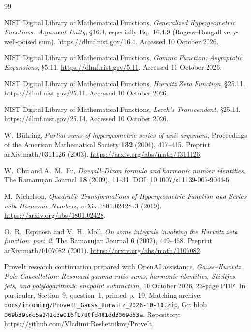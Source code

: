 \documentclass[11pt,letterpaper]{article}
\numberwithin{equation}{section}
\theoremstyle{definition}
\theoremstyle{remark}
\newcommand{\file}[1]{\nolinkurl{#1}}
\begin{document}
\begin{thebibliography}{99}
\raggedright

NIST Digital Library of Mathematical Functions,
\emph{Generalized Hypergeometric Functions: Argument Unity},
\S16.4, especially Eq.~16.4.9 (Rogers--Dougall very-well-poised sum).
\url{https://dlmf.nist.gov/16.4}. Accessed 10 October 2026.

NIST Digital Library of Mathematical Functions,
\emph{Gamma Function: Asymptotic Expansions}, \S5.11.
\url{https://dlmf.nist.gov/5.11}. Accessed 10 October 2026.

NIST Digital Library of Mathematical Functions,
\emph{Hurwitz Zeta Function}, \S25.11.
\url{https://dlmf.nist.gov/25.11}. Accessed 10 October 2026.

NIST Digital Library of Mathematical Functions,
\emph{Lerch's Transcendent}, \S25.14.
\url{https://dlmf.nist.gov/25.14}. Accessed 10 October 2026.

W.~B\"uhring, \emph{Partial sums of hypergeometric series of unit argument},
Proceedings of the American Mathematical Society \textbf{132} (2004),
407--415. Preprint arXiv:math/0311126 (2003).
\url{https://arxiv.org/abs/math/0311126}.

W.~Chu and A.~M.~Fu, \emph{Dougall--Dixon formula and harmonic number
identities}, The Ramanujan Journal \textbf{18} (2009), 11--31.
DOI: \href{https://doi.org/10.1007/s11139-007-9044-6}{10.1007/s11139-007-9044-6}.

M.~Nicholson, \emph{Quadratic Transformations of Hypergeometric Function
and Series with Harmonic Numbers}, arXiv:1801.02428v3 (2019).
\url{https://arxiv.org/abs/1801.02428}.

O.~R.~Espinosa and V.~H.~Moll,
\emph{On some integrals involving the Hurwitz zeta function: part~2},
The Ramanujan Journal \textbf{6} (2002), 449--468.
Preprint arXiv:math/0107082 (2001).
\url{https://arxiv.org/abs/math/0107082}.

ProveIt research continuation prepared with OpenAI assistance,
\emph{Gauss--Hurwitz Pole Cancellation: Resonant gamma-ratio sums,
harmonic identities, Stieltjes jets, and polylogarithmic endpoint
subtraction}, 10 October 2026, 23-page PDF. In particular, Section~9,
question~1, printed p.~19. Matching archive:
\file{docs/incoming/ProveIt_Gauss_Hurwitz_2026-10-10.zip},
Git blob \texttt{069b39cdc5a241c3e016f1780fd481dd3069d63a}.
Repository: \url{https://github.com/VladimirReshetnikov/ProveIt}.


\end{thebibliography}
\end{document}
